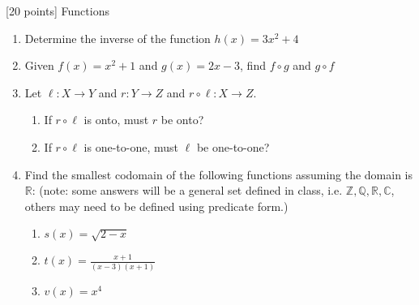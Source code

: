[20 points] Functions\\

\vspace{0.1in}

\begin{enumerate}
    \item Determine the inverse of the function \(h(x) = 3x^2 + 4\)\\

    \item Given \(f(x) = x^2 + 1\) and \(g(x) = 2x -3\), find \(f \circ g\) and \(g \circ f\)\\

    \item Let \(\ell : X \rightarrow Y\) and \(r : Y \rightarrow Z\) and \(r \circ \ell : X \rightarrow Z\). 
    \begin{enumerate}
        \item If \(r \circ \ell\) is onto, must \(r\) be onto?
        \item If \(r \circ \ell\) is one-to-one, must \(\ell\) be one-to-one?\\
    \end{enumerate}

    \item Find the smallest codomain of the following functions assuming the domain is $\mathbb{R}$: 
    (note: some answers will be a general set defined in class, i.e. $\mathbb{Z},\mathbb{Q}, \mathbb{R}, \mathbb{C}$, 
    others may need to be defined using predicate form.)
    \begin{enumerate}
        \item \(s(x) = \sqrt{2-x}\)
        \item \(t(x) = \frac{x+1}{(x-3)(x+1)}\)
        \item \(v(x) = x^4\)
    \end{enumerate}
    
  \end{enumerate}